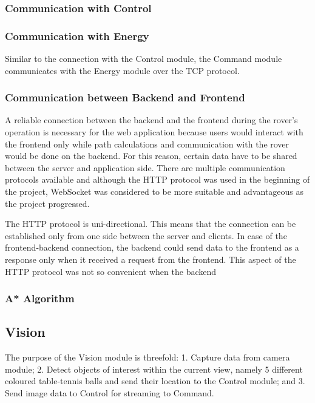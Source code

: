 \documentclass[a4paper]{article}
\begin{document}
\subsubsection{Communication with Control}

\subsubsection{Communication with Energy}
Similar to the connection with the Control module, the Command module communicates with the Energy module over 
the TCP protocol. 

\subsubsection{Communication between Backend and Frontend}
A reliable connection between the backend and the frontend during the rover's operation is necessary for the web 
application because users would interact with the frontend only while path calculations and communication with 
the rover would be done on the backend. For this reason, certain data have to be shared between the server 
and application side. There are multiple communication protocols available and although the HTTP protocol was used 
in the beginning of the project, WebSocket was considered to be more suitable and advantageous as the project 
progressed. 

The HTTP protocol is uni-directional. This means that the connection can be established only from one side between the 
server and clients. In case of the frontend-backend connection, the backend could send data to the frontend as a response 
only when it received a request from the frontend. This aspect of the HTTP protocol was not so convenient when the 
backend 

\subsubsection{A* Algorithm}

\subsection{Vision}
The purpose of the Vision module is threefold:
    1. Capture data from camera module;
    2. Detect objects of interest within the current view, namely 5 different
    coloured table-tennis balls and 
    send their location to the Control module; and
    3. Send image data to Control for streaming to Command. 
\end{document}
